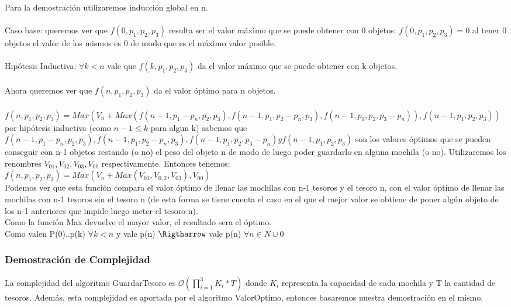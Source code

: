 \documentclass[spanish,12pt]{article}
\begin{document}
Para la demostración utilizaremos inducción global en n.
\\
\\
Caso base: queremos ver que $f(0,p_{1},p_{2},p_{3})$ resulta ser el valor máximo que se puede obtener con 0 objetos:
$f(0,p_{1},p_{2},p_{3}) = 0$ al tener 0 objetos el valor de los mismos es 0 de modo que es el máximo valor posible.
\\
\\
Hipótesis Inductiva: $\forall k<n$ vale que $f(k,p_{1},p_{2},p_{3})$ da el valor máximo que se puede obtener con k objetos.
\\
\\
Ahora queremos ver que $f(n,p_{1},p_{2},p_{3})$ da el valor óptimo para n objetos.
\\
\\
$f(n,p_{1},p_{2},p_{3}) = Max(V_{n}+Max(f(n-1,p_{1}-p_{n},p_{2},p_{3}), f(n-1,p_{1},p_{2}-p_{n},p_{3}), f(n-1,p_{1},p_{2},p_{3}-p_{n})),f(n-1,p_{1},p_{2},p_{3})) $ \\
por hipótesis inductiva (como $n-1 \leq k$ para algun k) sabemos que $f(n-1,p_{1}-p_{n},p_{2},p_{3}), f(n-1,p_{1},p_{2}-p_{n},p_{3}), f(n-1,p_{1},p_{2},p_{3}-p_{n}) y f(n-1,p_{1},p_{2},p_{3})$ son los valores óptimos que se pueden conseguir con n-1 objetos restando (o no) el peso del objeto n de modo de luego poder guardarlo en alguna mochila (o no). Utilizaremos los renombres $V_{01},V_{02},V_{03},V_{00}$ respectivamente.
Entonces tenemos: \\
$f(n,p_{1},p_{2},p_{3})= Max(V_{n}+Max(V_{01},V_{0,2},V_{03}),V_{00})$\\
Podemos ver que esta función  compara el valor óptimo de llenar las mochilas con n-1 tesoros y el tesoro n, con el valor óptimo de llenar las mochilas con n-1 tesoros sin el tesoro n (de esta forma se tiene cuenta el caso en el que el mejor valor se obtiene de poner algún objeto  de los n-1 anteriores que impide luego meter el tesoro n).\\
Como la función Max devuelve el mayor valor, el resultado sera el óptimo.
\\
Como valen P(0)..p(k) $\forall k<n$ y vale p(n) $\Rigtharrow$ vale p(n) $\forall n \in N \cup {0} $

\subsubsection{Demostración de Complejidad}

La complejidad del algoritmo GuardarTesoro es $\mathcal{O}(\prod_{i=1}^{3}K_{i} * T)$ donde $K_i$ representa la capacidad de cada mochila y T la cantidad de tesoros. Además, esta complejidad es aportada por el algoritmo ValorOptimo, entonces basaremos nuestra demostración en el mismo.
\end{document}
